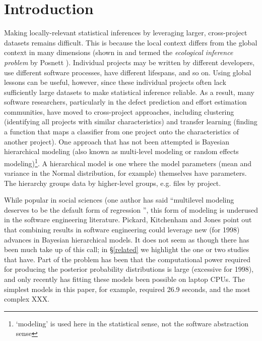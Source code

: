 \documentclass[sigconf,natbib=false]{acmart}
\begin{document}
\section{Introduction}
Making locally-relevant statistical inferences by leveraging larger, cross-project datasets remains difficult. This is because the local context differs from the global context in many dimensions (shown in \cite{zhang13context} and termed the \emph{ecological inference problem} by Posnett \cite{Posnett:2011}). Individual projects may be written by different developers, use different software processes, have different lifespans, and so on. Using global lessons can be useful, however, since these individual projects often lack sufficiently large datasets to make statistical inference reliable. As a result, many software researchers, particularly in the defect prediction and effort estimation communities, have moved to cross-project approaches, including clustering (identifying all projects with similar characteristics) and transfer learning (finding a function that maps a classifier from one project onto the characteristics of another project). One approach that has not been attempted is Bayesian hierarchical modeling (also known as multi-level modeling or random effects modeling)\footnote{`modeling' is used here in the statistical sense, not the software abstraction sense}. A hierarchical model is one where the model parameters (mean and variance in the Normal distribution, for example) themselves have parameters. The hierarchy groups data by higher-level groups, e.g. files by project.

While popular in social sciences (one author has said ``multilevel modeling deserves to be the default form of regression \cite[p.14]{mcilreath16}'', this form of modeling is underused in the software engineering literature. Pickard, Kitchenham and Jones \cite{PICKARD1998811} point out that combining results in software engineering could leverage new (for 1998) advances in Bayesian hierarchical models. It does not seem as though there has been much take up of this call; in \S \ref{related} we highlight the one or two studies that have. Part of the problem has been that the computational power required for producing the posterior probability distributions is large (excessive for 1998), and only recently has fitting these models been possible on laptop CPUs. The simplest models in this paper, for example, required 26.9 seconds, and the most complex XXX.

\end{document}
